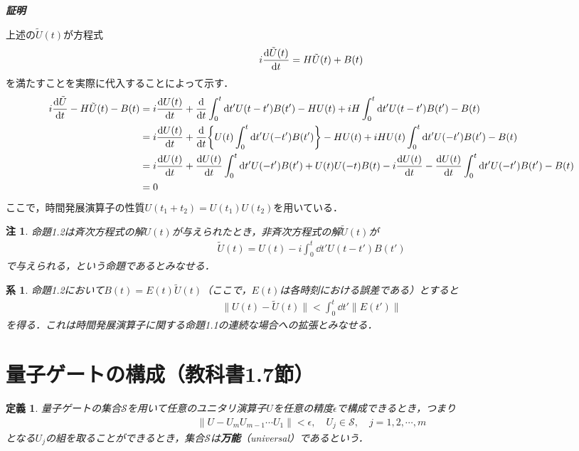 \documentclass[dvipdfmx]{jarticle}
\makeatletter
\numberwithin{equation}{section}
\renewenvironment{proof}[1][\proofname]{\par
  \pushQED{\qed}
  \normalfont \topsep6\p@\@plus6\p@\relax
  \trivlist
  \item\relax
  {\itshape
  #1\@addpunct{ }}\hspace\labelsep\ignorespaces
}{
  \popQED\endtrivlist\@endpefalse
}
\theoremstyle{seminar}
\newtheorem{definition}{定義}[section]
\newtheorem{corollary}{系}[section]
\newtheorem{remark}{注}[section]
\renewcommand{\proofname}{\textbf{証明}}
\makeatother
\begin{document}
\begin{proof}
  上述の$\tilde{U}(t)$が方程式
  \begin{align}
    i\dv{\tilde{U}(t)}{t} = H\tilde{U}(t) + B(t)
  \end{align}
  を満たすことを実際に代入することによって示す．
  \begin{align}
    \begin{split}
      i\dv{\tilde{U}}{t} - H\tilde{U}(t) - B(t) &= i\dv{U(t)}{t} + \dv{t}\int_0^t \dd t' U(t - t') B(t') - HU(t) + iH\int_0^t \dd t' U(t - t')B(t') - B(t) \\
      &= i\dv{U(t)}{t} + \dv{t}\qty{U(t)\int_0^t \dd t' U(- t') B(t')} - HU(t) + iHU(t)\int_0^t \dd t' U(-t')B(t') - B(t) \\
      &= i\dv{U(t)}{t} + \dv{U(t)}{t} \int_0^t \dd t' U(-t')B(t') + U(t) U(-t)B(t) -i\dv{U(t)}{t} - \dv{U(t)}{t} \int_0^t \dd t' U(-t')B(t') - B(t) \\
      &= 0
    \end{split}
  \end{align}
  ここで，時間発展演算子の性質$U(t_1 + t_2) = U(t_1)U(t_2)$を用いている．
\end{proof}

\begin{remark}
  命題1.2は斉次方程式の解$U(t)$が与えられたとき，非斉次方程式の解$\tilde{U}(t)$が
  \begin{align}
    \tilde{U}(t) = U(t) - i\int_0^t \dd t' U(t - t')B(t')
  \end{align}
  で与えられる，という命題であるとみなせる．
\end{remark}

\begin{corollary}
  命題1.2において$B(t) = E(t)\tilde{U}(t)$（ここで，$E(t)$は各時刻における誤差である）とすると
  \begin{align}
    \| U(t) - \tilde{U}(t) \| < \int_0^t \dd t' \| E(t') \|
  \end{align}
  を得る．これは時間発展演算子に関する命題1.1の連続な場合への拡張とみなせる．
\end{corollary}
\section{量子ゲートの構成（教科書1.7節）}

\begin{definition}
  量子ゲートの集合$\mathcal{S}$を用いて任意のユニタリ演算子$U$を任意の精度$\epsilon$で構成できるとき，つまり
  \begin{align}
    \| U - U_m U_{m-1} \cdots U_1 \| < \epsilon, \quad U_j \in \mathcal{S}, \quad j = 1, 2, \cdots, m
  \end{align}
  となる$U_j$の組を取ることができるとき，集合$\mathcal{S}$は{\bf 万能}（universal）であるという．
\end{definition}
\end{document}
